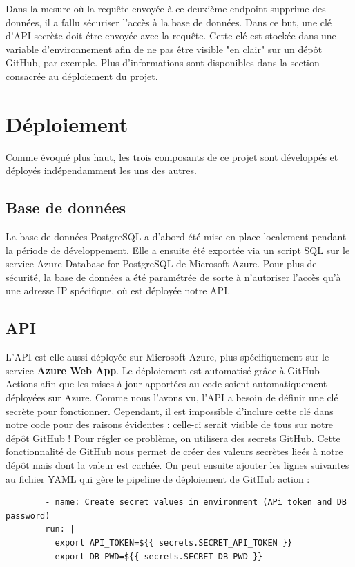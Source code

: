 \documentclass[french]{article}
\begin{document}
    Dans la mesure où la requête envoyée à ce deuxième endpoint supprime des données, il a fallu sécuriser l'accès à la base de données. Dans ce but, une clé d'API secrète doit étre envoyée avec la requête. Cette clé est stockée dans une variable d'environnement afin de ne pas être visible "en clair" sur un dépôt GitHub, par exemple. Plus d'informations sont disponibles dans la section consacrée au déploiement du projet.

    \section{Déploiement}
    Comme évoqué plus haut, les trois composants de ce projet sont développés et déployés indépendamment les uns des autres.
    \subsection{Base de données}
    La base de données PostgreSQL a d'abord été mise en place localement pendant la période de développement. Elle a ensuite été exportée via un script SQL sur le service Azure Database for PostgreSQL de Microsoft Azure. 
    Pour plus de sécurité, la base de données a été paramétrée de sorte à n'autoriser l'accès qu'à une adresse IP spécifique, où est déployée notre API.

    \subsection{API}

    L'API est elle aussi déployée sur Microsoft Azure, plus spécifiquement sur le service \textbf{Azure Web App}. Le déploiement est automatisé grâce à GitHub Actions afin que les mises à jour apportées au code soient automatiquement déployées sur Azure.
    Comme nous l'avons vu, l'API a besoin de définir une clé secrète pour fonctionner. Cependant, il est impossible d'inclure cette clé dans notre code pour des raisons évidentes : celle-ci serait visible de tous sur notre dépôt GitHub ! Pour régler ce problème, on utilisera des secrets GitHub. Cette fonctionnalité de GitHub nous permet de créer des valeurs secrètes lieés à notre dépôt mais dont la valeur est cachée. On peut ensuite ajouter les lignes suivantes au fichier YAML qui gère le pipeline de déploiement de GitHub action : 
    \begin{verbatim}
        - name: Create secret values in environment (APi token and DB password)
        run: |
          export API_TOKEN=${{ secrets.SECRET_API_TOKEN }}
          export DB_PWD=${{ secrets.SECRET_DB_PWD }}
    \end{verbatim}
\end{document}
